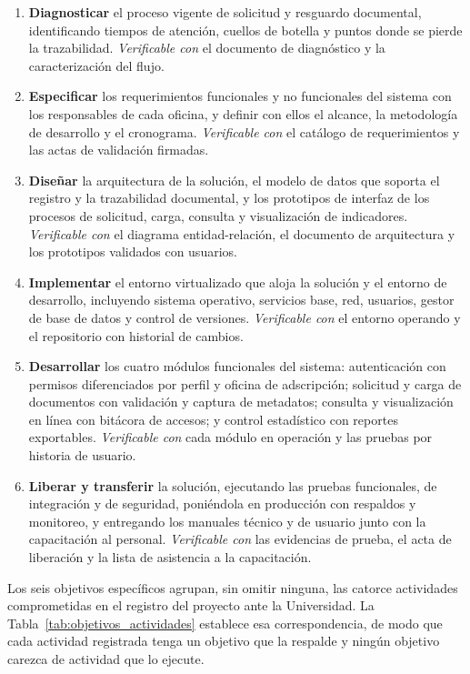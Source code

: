 \begin{enumerate}
  \item \textbf{Diagnosticar} el proceso vigente de solicitud y resguardo documental, identificando tiempos de atención, cuellos de botella y puntos donde se pierde la trazabilidad. \textit{Verificable con} el documento de diagnóstico y la caracterización del flujo.
  \item \textbf{Especificar} los requerimientos funcionales y no funcionales del sistema con los responsables de cada oficina, y definir con ellos el alcance, la metodología de desarrollo y el cronograma. \textit{Verificable con} el catálogo de requerimientos y las actas de validación firmadas.
  \item \textbf{Diseñar} la arquitectura de la solución, el modelo de datos que soporta el registro y la trazabilidad documental, y los prototipos de interfaz de los procesos de solicitud, carga, consulta y visualización de indicadores. \textit{Verificable con} el diagrama entidad-relación, el documento de arquitectura y los prototipos validados con usuarios.
  \item \textbf{Implementar} el entorno virtualizado que aloja la solución y el entorno de desarrollo, incluyendo sistema operativo, servicios base, red, usuarios, gestor de base de datos y control de versiones. \textit{Verificable con} el entorno operando y el repositorio con historial de cambios.
  \item \textbf{Desarrollar} los cuatro módulos funcionales del sistema: autenticación con permisos diferenciados por perfil y oficina de adscripción; solicitud y carga de documentos con validación y captura de metadatos; consulta y visualización en línea con bitácora de accesos; y control estadístico con reportes exportables. \textit{Verificable con} cada módulo en operación y las pruebas por historia de usuario.
  \item \textbf{Liberar y transferir} la solución, ejecutando las pruebas funcionales, de integración y de seguridad, poniéndola en producción con respaldos y monitoreo, y entregando los manuales técnico y de usuario junto con la capacitación al personal. \textit{Verificable con} las evidencias de prueba, el acta de liberación y la lista de asistencia a la capacitación.
\end{enumerate}

Los seis objetivos específicos agrupan, sin omitir ninguna, las catorce actividades comprometidas en el registro del proyecto ante la Universidad. La Tabla~\ref{tab:objetivos_actividades} establece esa correspondencia, de modo que cada actividad registrada tenga un objetivo que la respalde y ningún objetivo carezca de actividad que lo ejecute.

